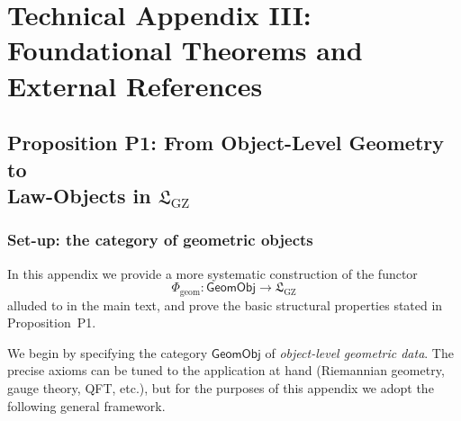 \documentclass[11pt]{book}
\theoremstyle{plain}
\theoremstyle{definition}
\newcommand{\GZLS}{\ensuremath{\mathfrak{L}_{\mathrm{GZ}}}}       \newcommand{\GZLT}{\ensuremath{M_{!w}}}                           \newcommand{\GZLOC}{\ensuremath{A_M}}                             \newcommand{\GZLCurv}{\ensuremath{\mathcal{F}_{\mathrm{law}}}}
\begin{document}
\chapter{Technical Appendix III: Foundational Theorems and External References}


\section[Proposition P1: From Object-Level Geometry to Law-Objects in GZ-LS]{Proposition P1: From Object-Level Geometry to \\ Law-Objects in \GZLS}
\label{app:III-P1}

\subsection*{Set-up: the category of geometric objects}


In this appendix we provide a more systematic construction of the
functor
\[
  \Phi_{\mathrm{geom}}:\mathsf{GeomObj}\longrightarrow\GZLS
\]
alluded to in the main text, and prove the basic structural
properties stated in Proposition~P1.

We begin by specifying the category \(\mathsf{GeomObj}\) of
\emph{object-level geometric data}.  The precise axioms can be tuned
to the application at hand (Riemannian geometry, gauge theory, QFT,
etc.), but for the purposes of this appendix we adopt the following
general framework.
\end{document}
